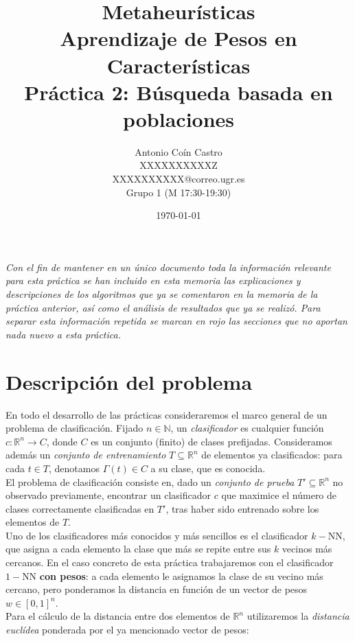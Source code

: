 \documentclass[12pt]{article}
\title{Metaheurísticas\\ \Large Aprendizaje de Pesos en Características \\ \large Práctica 2: Búsqueda basada en poblaciones}
\author{Antonio Coín Castro \\ XXXXXXXXXXZ \\ XXXXXXXXXX@correo.ugr.es \\ Grupo 1 (M 17:30-19:30)}
\date{\today}
\begin{document}
\maketitle
\tableofcontents

\newpage

\textit{Con el fin de mantener en un único documento toda la información relevante para esta práctica se han incluido en esta memoria las explicaciones y descripciones de los algoritmos que ya se comentaron en la memoria de la práctica anterior, así como el análisis de resultados que ya se realizó. Para separar esta información repetida se marcan en {\color{red}rojo} las secciones que no aportan nada nuevo a esta práctica.}
\restoregeometry

\newpage

\section{Descripción del problema}

En todo el desarrollo de las prácticas consideraremos el marco general de un problema de clasificación. Fijado $n \in \mathbb{N}$, un \textit{clasificador} es cualquier función $c: \mathbb{R}^n \to C$, donde $C$ es un conjunto (finito) de clases prefijadas. Consideramos además un \textit{conjunto de entrenamiento} $T \subseteq \mathbb{R}^n$ de elementos ya clasificados: para cada $t \in T$, denotamos $\Gamma(t) \in C$ a su clase, que es conocida.\\

El problema de clasificación consiste en, dado un \textit{conjunto de prueba} $T'\subseteq \mathbb{R}^n$ no observado previamente, encontrar un clasificador $c$ que maximice el número de clases correctamente clasificadas en $T'$, tras haber sido entrenado sobre los elementos de $T$.\\

Uno de los clasificadores más conocidos y más sencillos es el clasificador $k-$NN, que asigna a cada elemento la clase que más se repite entre sus $k$ vecinos más cercanos. En el caso concreto de esta práctica trabajaremos con el clasificador $1-$NN \textbf{con pesos}: a cada elemento le asignamos la clase de su vecino más cercano, pero ponderamos la distancia en función de un vector de pesos $w \in [0,1]^n$.\\

Para el cálculo de la distancia entre dos elementos de $\mathbb{R}^n$ utilizaremos la \textit{distancia euclídea} ponderada por el ya mencionado vector de pesos:
\end{document}
